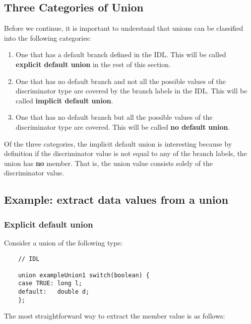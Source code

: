 \documentclass[11pt,twoside,onecolumn]{book}
\begin{document}
\subsection{Three Categories of Union}
\label{dynunioncat}

Before we continue, it is important to understand that unions can be
classified into the following categories:

\begin{enumerate}
\item One that has a default branch defined in the IDL. This will be called
{\bf explicit default union} in the rest of this section.
\item One that has no default branch and not all the possible values of the
discriminator type are covered by the branch labels in the IDL. This will
be called {\bf implicit default union}.
\item One that has no default branch but all the possible values of the
discriminator type are covered. This will be called {\bf no default union}.
\end{enumerate}

Of the three categories, the implicit default union is interesting because
by definition if the discriminator value is not equal to any of the branch
labels, the union has {\bf no} member. That is, the union value consists
solely of the discriminator value.

\subsection{Example: extract data values from a union}

\subsubsection{Explicit default union}

Consider a union of the following type:

{\small
\begin{verbatim}
    // IDL
    
    union exampleUnion1 switch(boolean) {
    case TRUE: long l;
    default:   double d; 
    };
\end{verbatim}
}

The most straightforward way to extract the member value is as follows:
\end{document}
